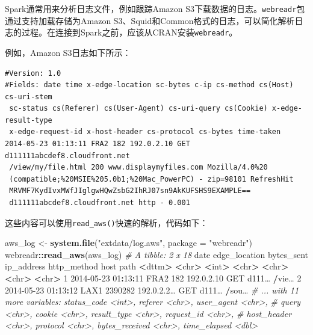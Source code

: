 \documentclass[
]{article}
\newenvironment{Shaded}{\begin{snugshade}}{\end{snugshade}}
\newcommand{\CommentTok}[1]{\textcolor[rgb]{0.56,0.35,0.01}{\textit{#1}}}
\newcommand{\DataTypeTok}[1]{\textcolor[rgb]{0.13,0.29,0.53}{#1}}
\newcommand{\DecValTok}[1]{\textcolor[rgb]{0.00,0.00,0.81}{#1}}
\newcommand{\ErrorTok}[1]{\textcolor[rgb]{0.64,0.00,0.00}{\textbf{#1}}}
\newcommand{\FloatTok}[1]{\textcolor[rgb]{0.00,0.00,0.81}{#1}}
\newcommand{\KeywordTok}[1]{\textcolor[rgb]{0.13,0.29,0.53}{\textbf{#1}}}
\newcommand{\NormalTok}[1]{#1}
\newcommand{\OperatorTok}[1]{\textcolor[rgb]{0.81,0.36,0.00}{\textbf{#1}}}
\newcommand{\StringTok}[1]{\textcolor[rgb]{0.31,0.60,0.02}{#1}}
\begin{document}
Spark通常用来分析日志文件，例如跟踪Amazon
S3下载数据的日志。\texttt{webreadr}包通过支持加载存储为Amazon
S3、Squid和Common格式的日志，可以简化解析日志的过程。在连接到Spark之前，应该从CRAN安装\texttt{webreadr}。

例如，Amazon S3日志如下所示：

\begin{verbatim}
#Version: 1.0
#Fields: date time x-edge-location sc-bytes c-ip cs-method cs(Host) cs-uri-stem
 sc-status cs(Referer) cs(User-Agent) cs-uri-query cs(Cookie) x-edge-result-type
 x-edge-request-id x-host-header cs-protocol cs-bytes time-taken
2014-05-23 01:13:11 FRA2 182 192.0.2.10 GET d111111abcdef8.cloudfront.net
 /view/my/file.html 200 www.displaymyfiles.com Mozilla/4.0%20
 (compatible;%20MSIE%205.0b1;%20Mac_PowerPC) - zip=98101 RefreshHit
 MRVMF7KydIvxMWfJIglgwHQwZsbG2IhRJ07sn9AkKUFSHS9EXAMPLE==
 d111111abcdef8.cloudfront.net http - 0.001
\end{verbatim}

这些内容可以使用\texttt{read\_aws()}快速的解析，代码如下：

\begin{Shaded}
\begin{Highlighting}[]
\NormalTok{aws_log <-}\StringTok{ }\KeywordTok{system.file}\NormalTok{(}\StringTok{"extdata/log.aws"}\NormalTok{, }\DataTypeTok{package =} \StringTok{"webreadr"}\NormalTok{)}
\NormalTok{webreadr}\OperatorTok{::}\KeywordTok{read_aws}\NormalTok{(aws_log)}
\CommentTok{# A tibble: 2 x 18}
\NormalTok{ date edge_location bytes_sent ip_address http_method host path}
 \OperatorTok{<}\NormalTok{dttm}\OperatorTok{>}\StringTok{ }\ErrorTok{<}\NormalTok{chr}\OperatorTok{>}\StringTok{ }\ErrorTok{<}\NormalTok{int}\OperatorTok{>}\StringTok{ }\ErrorTok{<}\NormalTok{chr}\OperatorTok{>}\StringTok{ }\ErrorTok{<}\NormalTok{chr}\OperatorTok{>}\StringTok{ }\ErrorTok{<}\NormalTok{chr}\OperatorTok{>}\StringTok{ }\ErrorTok{<}\NormalTok{chr}\OperatorTok{>}
\DecValTok{1} \DecValTok{2014-05-23} \DecValTok{01}\OperatorTok{:}\DecValTok{13}\OperatorTok{:}\DecValTok{11}\NormalTok{ FRA2 }\DecValTok{182} \DecValTok{192}\NormalTok{.}\DecValTok{0}\NormalTok{.}\FloatTok{2.10}\NormalTok{ GET d111… }\OperatorTok{/}\NormalTok{vie…}
\DecValTok{2} \DecValTok{2014-05-23} \DecValTok{01}\OperatorTok{:}\DecValTok{13}\OperatorTok{:}\DecValTok{12}\NormalTok{ LAX1 }\DecValTok{2390282} \DecValTok{192}\NormalTok{.}\DecValTok{0}\NormalTok{.}\FloatTok{2.2}\NormalTok{… GET d111… }\OperatorTok{/}\NormalTok{sou…}
\CommentTok{# ... with 11 more variables: status_code <int>, referer <chr>, user_agent <chr>,}
\CommentTok{# query <chr>, cookie <chr>, result_type <chr>, request_id <chr>,}
\CommentTok{# host_header <chr>, protocol <chr>, bytes_received <chr>, time_elapsed <dbl>}
\end{Highlighting}
\end{Shaded}
\end{document}
